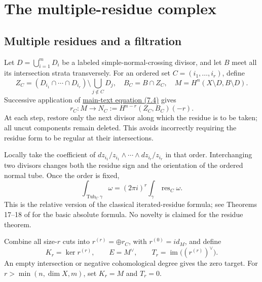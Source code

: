 \documentclass[11pt,a4paper,oneside]{article}
\theoremstyle{plain}
\theoremstyle{definition}
\theoremstyle{remark}
\numberwithin{equation}{section}
\newcommand{\otherref}[2]{\href{#1.pdf}{#2}}
\begin{document}
\section{The multiple-residue complex}\label{supp:cut}
\begingroup
\subsection{Multiple residues and a filtration}\label{sec:cut:3}
Let \(D=\bigcup_{i=1}^mD_i\) be a labeled simple-normal-crossing divisor, and let $B$ meet all its intersection strata transversely. For an ordered set \(C=(i_1,\ldots,i_r)\), define
\begin{equation}
Z_C=(D_{i_1}\cap\cdots\cap D_{i_r})
                         \setminus\bigcup_{j\notin C}D_j,
 \quad B_C=B\cap Z_C,
 \quad M=H^n(X\setminus D,B\setminus D).
\end{equation}
Successive application of \otherref{feynman_periods_long_paper_en}{main-text equation (7.4)} gives
\begin{equation}
r_C:M\longrightarrow N_C:=H^{n-r}(Z_C,B_C)(-r).       \label{eq:cut:3.1}
\end{equation}
At each step, restore only the next divisor along which the residue is to be taken; all uncut components remain deleted. This avoids incorrectly requiring the residue form to be regular at their intersections.

Locally take the coefficient of \(dz_{i_1}/z_{i_1}\wedge\cdots\wedge dz_{i_r}/z_{i_r}\) in that order. Interchanging two divisors changes both the residue sign and the orientation of the ordered normal tube. Once the order is fixed,
\begin{equation}
\int_{\operatorname{Tub}_C\gamma}\omega
       =(2\pi i)^r\int_\gamma\operatorname{res}_C\omega.\label{eq:cut:3.2}
\end{equation}
This is the relative version of the classical iterated-residue formula; see Theorems 17--18 of \cite{muhlbauer} for the basic absolute formula. No novelty is claimed for the residue theorem.

Combine all size-$r$ cuts into \(r^{(r)}=\oplus r_C\), with \(r^{(0)}=id_M\), and define
\begin{equation}
K_r=\ker r^{(r)},\qquad E=M^\vee,\qquad
 T_r=\operatorname{im}\bigl((r^{(r)})^\vee\bigr).
                                                               \label{eq:cut:3.3}
\end{equation}
An empty intersection or negative cohomological degree gives the zero target. For \(r>\min(n,\dim X,m)\), set \(K_r=M\) and \(T_r=0\).
\end{document}
